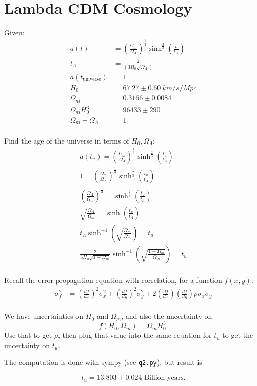 \section{Lambda CDM Cosmology}
Given:
\begin{align*}
    a(t) &= \left(\frac{\Omega_m}{\Omega_\Lambda}\right)^\frac{1}{3} \sinh^{\frac{2}{3}}\left(\frac{t}{t_\Lambda}\right) \\
    t_\Lambda &= \frac{2}{\left(3H_0\sqrt{\Omega_\Lambda}\right)} \\
    a(t_{\text{universe}}) &= 1 \\
    H_0 &= 67.27 \pm \SI{0.60}{km/s/Mpc} \\
    \Omega_m &= 0.3166 \pm 0.0084 \\
    \Omega_m H_0^3 &= 96433 \pm 290 \\
    \Omega_m + \Omega_\Lambda &= 1 \\
\end{align*}

Find the age of the universe in terms of $H_0, \Omega_\Lambda$:
\begin{align*}
    a(t_u) = \left(\frac{\Omega_m}{\Omega_\Lambda}\right)^\frac{1}{3} \sinh^{\frac{2}{3}}\left(\frac{t_u}{t_\Lambda}\right)\\
    1 = \left(\frac{\Omega_m}{\Omega_\Lambda}\right)^\frac{1}{3} \sinh^{\frac{2}{3}}\left(\frac{t_u}{t_\Lambda}\right)\\
    \left(\frac{\Omega_\Lambda}{\Omega_m}\right)^\frac{1}{3} = \sinh^{\frac{2}{3}}\left(\frac{t_u}{t_\Lambda}\right)\\
    \sqrt{\frac{\Omega_\Lambda}{\Omega_m}} = \sinh\left(\frac{t_u}{t_\Lambda}\right)\\
    t_\Lambda\sinh^{-1}\left(\sqrt{\frac{\Omega_m}{\Omega_m}}\right) = t_u\\
    \frac{2}{3H_0\sqrt{1 - \Omega_m}}\sinh^{-1}\left(\sqrt{\frac{1 - \Omega_m}{\Omega_m}}\right) = t_u\\
\end{align*}

Recall the error propagation equation with correlation, for a function $f(x,y)$:
\begin{align*}
    \sigma_f^2 &= \left(\frac{df}{dx}\right)^2 \sigma_x^2 + \left(\frac{df}{dy}\right)^2 \sigma_y^2 + 2\left(\frac{df}{dx}\right)\left(\frac{df}{dy}\right)\rho \sigma_x \sigma_y \\
\end{align*}

We have uncertainties on $H_0$ and $\Omega_m$, and also the uncertainty on $$f(H_0, \Omega_m) = \Omega_m H_0^3.$$ Use that to get $\rho$, then plug that value into the same equation for $t_u$ to get the uncertainty on $t_u$.

The computation is done with sympy (see \texttt{q2.py}), but result is

$$t_u = 13.803 \pm 0.024 \text{ Billion years.}$$
